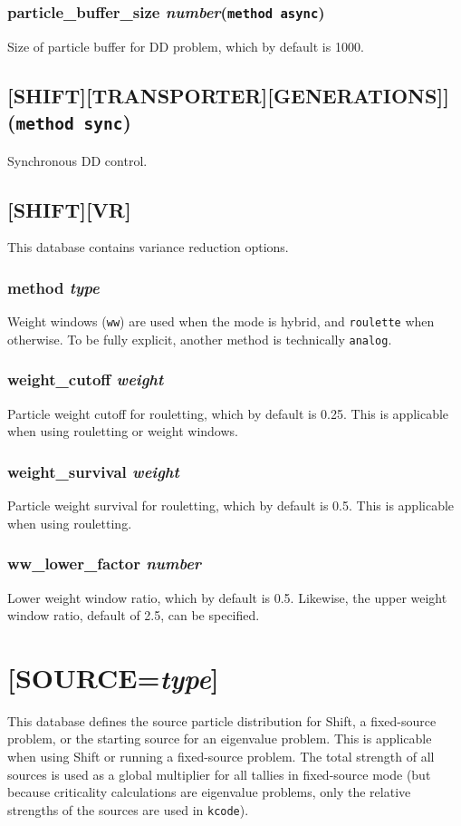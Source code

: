 \documentclass[10pt]{article}
\begin{document}
\subsubsection{particle\_buffer\_size \textit{number}\quad\quad\quad(\texttt{method async})}
Size of particle buffer for DD problem, which by default is 1000. 

\subsection{[SHIFT][TRANSPORTER][GENERATIONS]]\quad\quad\quad(\texttt{method sync})}
Synchronous DD control.

\subsection{[SHIFT][VR]}
This database contains variance reduction options.

\subsubsection{method \textit{type}}
Weight windows (\texttt{ww}) are used when the mode is hybrid, and \texttt{roulette} when otherwise. To be fully explicit, another method is technically \texttt{analog}.

\subsubsection{weight\_cutoff \textit{weight}}
Particle weight cutoff for rouletting, which by default is 0.25. This is applicable when using rouletting or weight windows.

\subsubsection{weight\_survival \textit{weight}}
Particle weight survival for rouletting, which by default is 0.5. This is applicable when using rouletting.

\subsubsection{ww\_lower\_factor \textit{number}}
Lower weight window ratio, which by default is 0.5. Likewise, the upper weight window ratio, default of 2.5, can be specified.

\section{[SOURCE=\textit{type}]}
This database defines the source particle distribution for Shift, a fixed-source problem, or the starting source for an eigenvalue problem. This is applicable when using Shift or running a fixed-source problem. The total strength of all sources is used as a global multiplier for all tallies in fixed-source mode (but because criticality calculations are eigenvalue problems, only the relative strengths of the sources are used in \texttt{kcode}). 
\end{document}
